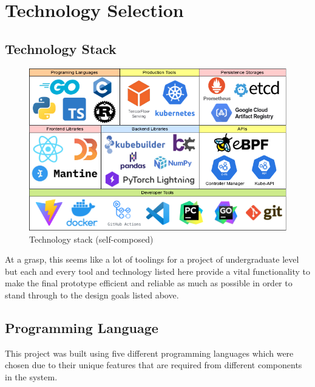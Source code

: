 \section{Technology Selection}
\subsection{Technology Stack}

\begin{figure}[H] 
    \includegraphics[width=13cm]{assets/implementation/technology-stack.png}
    \caption{Technology stack (self-composed)}
    \label{fig:technology-stack}
\end{figure}

At a grasp, this seems like a lot of toolings for a project of undergraduate level but each and every tool and technology listed here provide a vital functionality to make the final prototype efficient and reliable as much as possible in order to stand through to the design goals listed above.

\subsection{Programming Language}

This project was built using five different programming languages which were chosen due to their unique features that are required from different components in the system.

